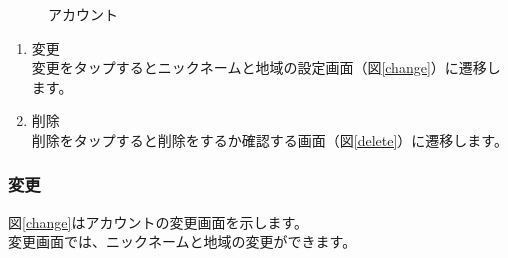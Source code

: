 \documentclass[a4j]{jarticle}
\begin{document}
\begin{figure}[H]
    \begin{center}
    \caption {アカウント}
    \label{account}
    \end{center}
\end{figure}

\begin{enumerate}
  \renewcommand{\labelenumi}{\textcircled{\scriptsize \theenumi}}
\item 変更\\
  変更をタップするとニックネームと地域の設定画面（図\ref{change}）に遷移します。
\item 削除\\
  削除をタップすると削除をするか確認する画面（図\ref{delete}）に遷移します。
\end{enumerate}

\newpage
\subsubsection{変更}
図\ref{change}はアカウントの変更画面を示します。\\
変更画面では、ニックネームと地域の変更ができます。
\end{document}
